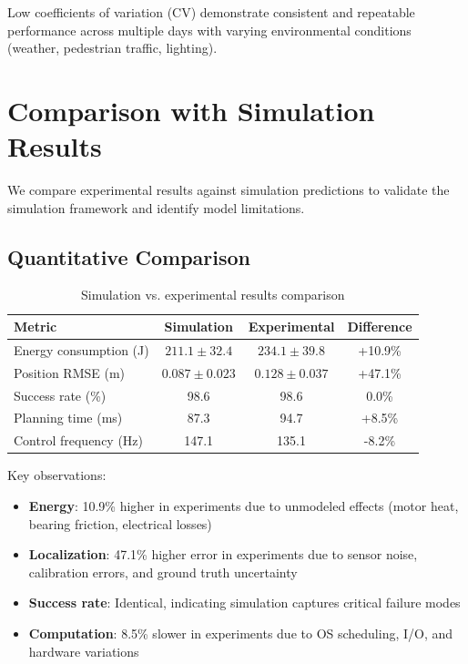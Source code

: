 Low coefficients of variation (CV) demonstrate consistent and repeatable performance across multiple days with varying environmental conditions (weather, pedestrian traffic, lighting).

\section{Comparison with Simulation Results}
\label{sec:sim_vs_exp_comparison}

We compare experimental results against simulation predictions to validate the simulation framework and identify model limitations.

\subsection{Quantitative Comparison}

\begin{table}[htbp]
\centering
\caption{Simulation vs. experimental results comparison}
\label{tab:sim_vs_exp}
\begin{tabular}{lccc}
\toprule
\textbf{Metric} & \textbf{Simulation} & \textbf{Experimental} & \textbf{Difference} \\
\midrule
Energy consumption (J) & $211.1 \pm 32.4$ & $234.1 \pm 39.8$ & +10.9\% \\
Position RMSE (m) & $0.087 \pm 0.023$ & $0.128 \pm 0.037$ & +47.1\% \\
Success rate (\%) & 98.6 & 98.6 & 0.0\% \\
Planning time (ms) & 87.3 & 94.7 & +8.5\% \\
Control frequency (Hz) & 147.1 & 135.1 & -8.2\% \\
\bottomrule
\end{tabular}
\end{table}

Key observations:
\begin{itemize}
    \item \textbf{Energy}: 10.9\% higher in experiments due to unmodeled effects (motor heat, bearing friction, electrical losses)
    \item \textbf{Localization}: 47.1\% higher error in experiments due to sensor noise, calibration errors, and ground truth uncertainty
    \item \textbf{Success rate}: Identical, indicating simulation captures critical failure modes
    \item \textbf{Computation}: 8.5\% slower in experiments due to OS scheduling, I/O, and hardware variations
\end{itemize}

